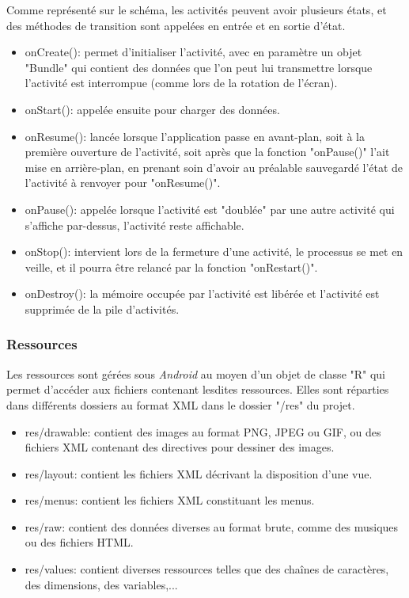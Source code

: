 Comme représenté sur le schéma, les activités peuvent avoir plusieurs états, et des méthodes de transition sont appelées en entrée et en sortie d'état.
\begin{itemize}
\item onCreate(): permet d'initialiser l'activité, avec en paramètre un objet "Bundle" qui contient des données que l'on peut lui transmettre lorsque l'activité est interrompue (comme lors de la rotation de l'écran).
\item onStart(): appelée ensuite pour charger des données.
\item onResume(): lancée lorsque l'application passe en avant-plan, soit à la première ouverture de l'activité, soit après que la fonction "onPause()" l'ait mise en arrière-plan, en prenant soin d'avoir au préalable sauvegardé l'état de l'activité à renvoyer pour "onResume()".
\item onPause(): appelée lorsque l'activité est "doublée" par une autre activité qui s'affiche par-dessus, l'activité reste affichable.
\item onStop(): intervient lors de la fermeture d'une activité, le processus se met en veille, et il pourra être relancé par la fonction "onRestart()".
\item onDestroy(): la mémoire occupée par l'activité est libérée et l'activité est supprimée de la pile d'activités.
\end{itemize}

\subsubsection{Ressources} Les ressources sont gérées sous \textit{Android} au moyen d'un objet de classe "R" qui permet d'accéder aux fichiers contenant lesdites ressources. Elles sont réparties dans différents dossiers au format XML dans le dossier "/res" du projet. 
\begin{itemize}
\item res/drawable: contient des images au format PNG, JPEG ou GIF, ou des fichiers XML contenant des directives pour dessiner des images.
\item res/layout: contient les fichiers XML décrivant la disposition d'une vue.
\item res/menus: contient les fichiers XML constituant les menus.
\item res/raw: contient des données diverses au format brute, comme des musiques ou des fichiers HTML.
\item res/values: contient diverses ressources telles que des chaînes de caractères, des dimensions, des variables,... 
\end{itemize}

